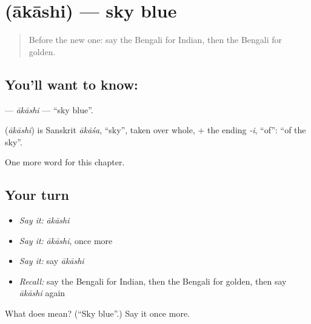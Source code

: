 \section[\texorpdfstring{\bn{আকাশি} (ākāshi)}{আকাশি (ākāshi)}]{ (ākāshi) — sky blue}

\label{lesson:BN-C246-akashi}



\begin{quote}
Before the new one: say the Bengali for Indian, then the Bengali for golden.
\end{quote}

\subsection*{You'll want to know: }
\textbf{} — \emph{ākāshi} — \textquotedblleft{}sky blue\textquotedblright{}.

\begin{cousinweb}
\textbf{} (\emph{ākāshi}) is Sanskrit \emph{ākāśa}, \textquotedblleft{}sky\textquotedblright{}, taken over whole, + the ending \emph{-i}, \textquotedblleft{}of\textquotedblright{}: \textquotedblleft{}of the sky\textquotedblright{}.
\end{cousinweb}

\begin{grammarlens}[title={What you've built}]
One more word for this chapter.
\end{grammarlens}

\subsection*{Your turn}
\begin{itemize}
\raggedright
  \item \emph{Say it:} \emph{ākāshi}
  \item \emph{Say it:} \emph{ākāshi}, once more
  \item \emph{Say it:} say \emph{ākāshi}
  \item \emph{Recall:} say the Bengali for Indian, then the Bengali for golden, then say \emph{ākāshi} again
\end{itemize}

\begin{tcolorbox}[breakable,colback=teal!4,colframe=teal!35!black,title={Before you move on}]
What does  mean? (\textquotedblleft{}Sky blue\textquotedblright{}.) Say it once more.
\end{tcolorbox}
